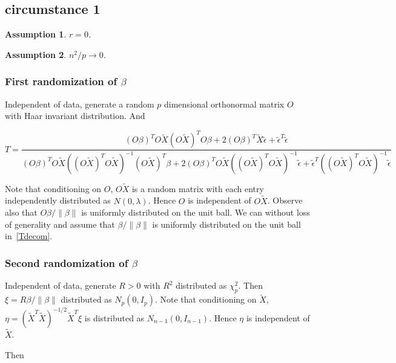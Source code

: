 \documentclass[review]{elsarticle}
\theoremstyle{plain}
\newtheorem{assumption}{\quad\quad Assumption}
\theoremstyle{definition}
\theoremstyle{remark}
\begin{document}
\subsection{circumstance 1}
\begin{assumption}
    $r=0$.
\end{assumption}
\begin{assumption}
    $n^2/p\to 0$.
\end{assumption}

\subsubsection{First randomization of $\beta$}
Independent of data, generate a random $p$ dimensional orthonormal matrix $O$ with Haar invariant distribution. And 

\begin{equation}
    T=\frac{{(O\beta)}^T O\tilde{X}{(O\tilde{X})}^T O\beta+
        2{(O\beta)}^T \tilde{X}\tilde{\epsilon}+
        \tilde{\epsilon}^T\tilde{\epsilon}
    }{{(O\beta)}^T O\tilde{X}{({(O\tilde{X})}^T O\tilde{X})}^{-1}{(O\tilde{X})}^T \beta+
        2{(O\beta)}^T O\tilde{X}{({(O\tilde{X})}^T O\tilde{X})}^{-1}\tilde{\epsilon}+
        \tilde{\epsilon}^T{({(O\tilde{X})}^T O\tilde{X})}^{-1}\tilde{\epsilon}
    }
\end{equation}

Note that conditioning on $O$, $O\tilde{X}$ is a random matrix with each entry independently distributed as $N(0,\lambda)$. Hence $O$ is independent of $O\tilde{X}$. Observe also that $O\beta/\|\beta\|$ is uniformly distributed on the unit ball.  We can without loss of generality and assume that $\beta/\|\beta\|$ is uniformly distributed on the unit ball in~\eqref{Tdecom}.

\subsubsection{Second randomization of $\beta$}
Independent of data, generate $R>0$ with $R^2$ distributed as $\chi^2_{p}$. Then $\xi=R\beta/\|\beta\|$ distributed as $N_p(0,I_p)$.
Note that conditioning on $\tilde{X}$, $\eta={(\tilde{X}^T\tilde{X})}^{-1/2}\tilde{X}^T \xi$ is distributed as $N_{n-1}(0,I_{n-1})$. Hence $\eta$ is independent of $\tilde{X}$.

Then
\end{document}
